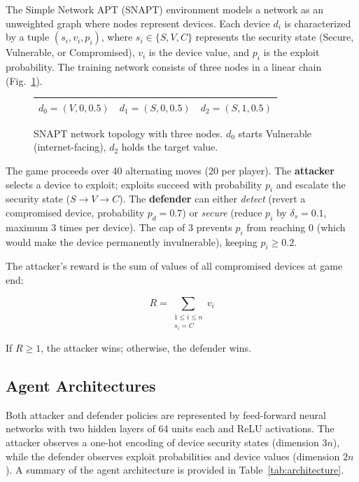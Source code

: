 \documentclass[conference, 10pt]{IEEEtran}
\begin{document}
The Simple Network APT (SNAPT) environment models a network as an unweighted graph where nodes represent devices. Each device $d_i$ is characterized by a tuple $(s_i, v_i, p_i)$, where $s_i \in \{S, V, C\}$ represents the security state (Secure, Vulnerable, or Compromised), $v_i$ is the device value, and $p_i$ is the exploit probability. The training network consists of three nodes in a linear chain (Fig.~\ref{fig:snapt_network}).

\begin{figure}[h]
\centering
\small
\begin{tabular}{|c|c|c|}
\hline
$d_0 = (V, 0, 0.5)$ & $d_1 = (S, 0, 0.5)$ & $d_2 = (S, 1, 0.5)$ \\
\hline
\end{tabular}
\caption{SNAPT network topology with three nodes. $d_0$ starts Vulnerable (internet-facing), $d_2$ holds the target value.}
\label{fig:snapt_network}
\end{figure}

The game proceeds over 40 alternating moves (20 per player). The \textbf{attacker} selects a device to exploit; exploits succeed with probability $p_i$ and escalate the security state ($S \rightarrow V \rightarrow C$). The \textbf{defender} can either \textit{detect} (revert a compromised device, probability $p_d = 0.7$) or \textit{secure} (reduce $p_i$ by $\delta_s = 0.1$, maximum 3 times per device). The cap of 3 prevents $p_i$ from reaching $0$ (which would make the device permanently invulnerable), keeping $p_i \geq 0.2$.

The attacker's reward is the sum of values of all compromised devices at game end:

\begin{equation}
    R = \sum_{\substack{1 \leq i \leq n \\ s_i = C}} v_i
\end{equation}

\noindent If $R \geq 1$, the attacker wins; otherwise, the defender wins.

\subsection{Agent Architectures}

Both attacker and defender policies are represented by feed-forward neural networks with two hidden layers of 64 units each and ReLU activations. The attacker observes a one-hot encoding of device security states (dimension $3n$), while the defender observes exploit probabilities and device values (dimension $2n$). A summary of the agent architecture is provided in Table~\ref{tab:architecture}.
\end{document}
